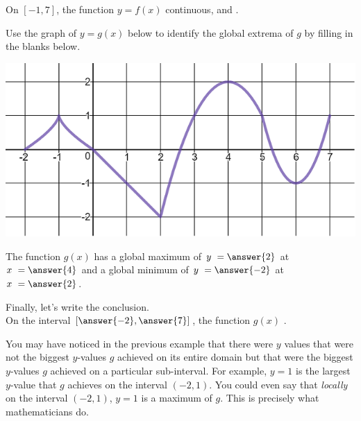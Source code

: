 \documentclass{ximera}
\begin{document}
\begin{exercise}
\begin{exercise}
\begin{exercise}
On $[-1,7]$, the function $y=f(x)$  continuous, and .
\end{exercise}
\end{exercise}
\end{exercise}

\begin{exercise}
Use the graph of $y = g(x)$ below to identify the global extrema of $g$ by filling in the blanks below. 

\begin{center} \includegraphics[scale=0.5]{extrema3new.png} \end{center}

The function $g(x)$ has a global maximum of $y \ = \answer{2}$ at $x \ = \answer{4}$ and a global minimum of $y \ = \answer{-2}$ at $x \ = \answer{2}$.

\begin{exercise}
Finally, let's write the conclusion.  \\

On the  interval $\left[ \answer{-2}, \answer{7}\right]$, the function $g(x)$ .
\end{exercise}
\end{exercise}

You may have noticed in the previous example that there were $y$ values that were not the biggest $y$-values $g$ achieved on its entire domain but that were the biggest $y$-values $g$ achieved on a particular sub-interval.  For example, $y=1$ is the largest $y$-value that $g$ achieves on the interval $(-2, 1)$.  You could even say that \textit{locally} on the interval $(-2,1)$, $y=1$ is a maximum of $g$.  This is precisely what mathematicians do.  
\end{document}
